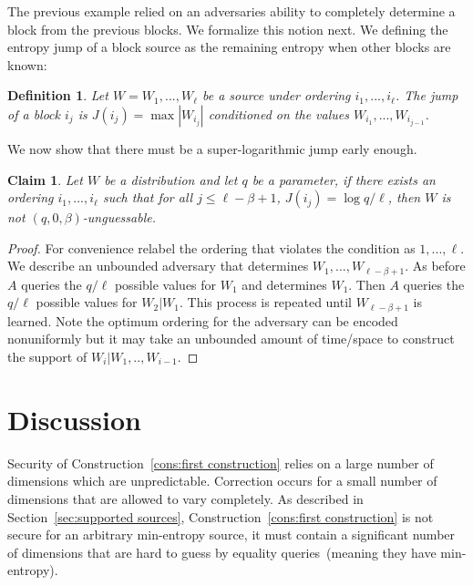 \documentclass[11pt]{article}
\newcommand{\secref}[1]{\mbox{Section~\ref{#1}}}
\newcommand{\consref}[1]{\mbox{Construction~\ref{#1}}}
\newtheorem{definition}[theorem]{Definition}
\newtheorem{claim}[theorem]{Claim}
\begin{document}
The previous example relied on an adversaries ability to completely determine a block from the previous blocks.  We formalize this notion next.  We defining the entropy jump of a block source as the remaining entropy when other blocks are known:

\begin{definition}
Let $W = W_1,..., W_\ell$ be a source under ordering $i_1,..., i_\ell$.  The \emph{jump} of a block $i_j$ is $J(i_j) = \max|W_{i_j} |$ conditioned on the values $W_{i_1},..., W_{i_{j-1}}$.
\end{definition}

We now show that there must be a super-logarithmic jump early enough.

\begin{claim}
Let $W$ be a distribution and let $q$ be a parameter, if there exists an ordering $i_1,..., i_\ell$ such that for all $j\le \ell-\beta +1$, $J(i_j) = \log q /\ell$, then $W$ is not $(q, 0, \beta)$-unguessable.
\end{claim}

\begin{proof}
For convenience relabel the ordering that violates the condition as $1,..., \ell$.  We describe an unbounded adversary that determines $W_1,..., W_{\ell-\beta+1}$.  As before $A$ queries the $q /\ell$ possible values for $W_1$ and determines $W_1$.  Then $A$ queries the $q/\ell$ possible values for $W_2 | W_1$.  This process is repeated until $W_{\ell-\beta+1}$ is learned.  Note the optimum ordering for the adversary can be encoded nonuniformly but it may take an unbounded amount of time/space to construct the support of $W_i | W_1,.., W_{i-1}$.
\end{proof}

\section{Discussion}
\label{sec:discussion}
Security of \consref{cons:first construction} relies on a large number of dimensions which are unpredictable.  Correction occurs for a small number of dimensions that are allowed to vary completely.  As described in \secref{sec:supported sources}, \consref{cons:first construction} is not secure for an arbitrary min-entropy source, it must contain a significant number of dimensions that are hard to guess by equality queries~(meaning they have min-entropy).
\end{document}
